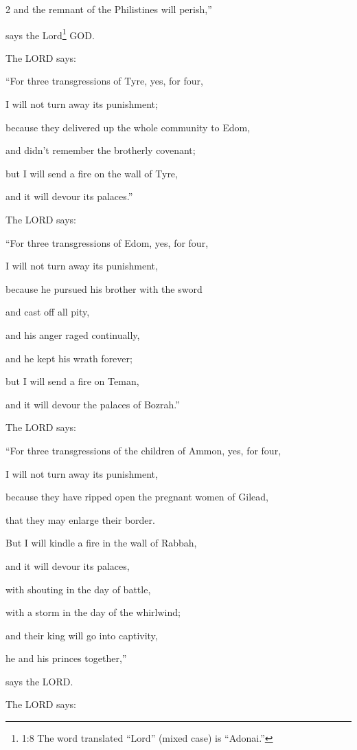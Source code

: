 \begin{multicols}{2}
	and the remnant of the Philistines will perish,”
	
	says the Lord\footnote{1:8 The word translated “Lord” (mixed case) is “Adonai.”} GOD.
	
	\myverse{}The LORD says:
	
	“For three transgressions of Tyre, yes, for four,
	
	I will not turn away its punishment;
	
	because they delivered up the whole community to Edom,
	
	and didn’t remember the brotherly covenant;
	
	\myverse{}but I will send a fire on the wall of Tyre,
	
	and it will devour its palaces.”
	
	\myverse{}The LORD says:
	
	“For three transgressions of Edom, yes, for four,
	
	I will not turn away its punishment,
	
	because he pursued his brother with the sword
	
	and cast off all pity,
	
	and his anger raged continually,
	
	and he kept his wrath forever;
	
	\myverse{}but I will send a fire on Teman,
	
	and it will devour the palaces of Bozrah.”
	
	\myverse{}The LORD says:
	
	“For three transgressions of the children of Ammon, yes, for four,
	
	I will not turn away its punishment,
	
	because they have ripped open the pregnant women of Gilead,
	
	that they may enlarge their border.
	
	\myverse{}But I will kindle a fire in the wall of Rabbah,
	
	and it will devour its palaces,
	
	with shouting in the day of battle,
	
	with a storm in the day of the whirlwind;
	
	\myverse{}and their king will go into captivity,
	
	he and his princes together,”
	
	says the LORD.
	
	
	\mychapter{} \myverse*{}The LORD says:
	

\end{multicols}
